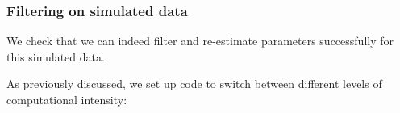 \begin{frame}[fragile]

\frametitle{Filtering on simulated data}

\bi

\item We check that we can indeed filter and re-estimate parameters successfully for this simulated data.  

\item As previously discussed, we set up code to switch between different levels of computational intensity:

\ei

\begin{knitrout}\small
{}\color{fgcolor}\begin{kframe}
\begin{alltt}
 \hlkwb{<-} 
 \hlkwb{<-}             \hldef{,} \hldef{,} \hldef{)}
 \hlkwb{<-}            \hldef{,} \hldef{,} \hldef{)}
 \hlkwb{<-}      \hldef{,}  \hldef{,}  \hldef{)}
 \hlkwb{<-}     \hldef{,}  \hldef{,}  \hldef{)}
 \hlkwb{<-}    \hldef{,}  \hldef{,} \hldef{)}
\end{alltt}
\end{kframe}
\end{knitrout}

\end{frame}

